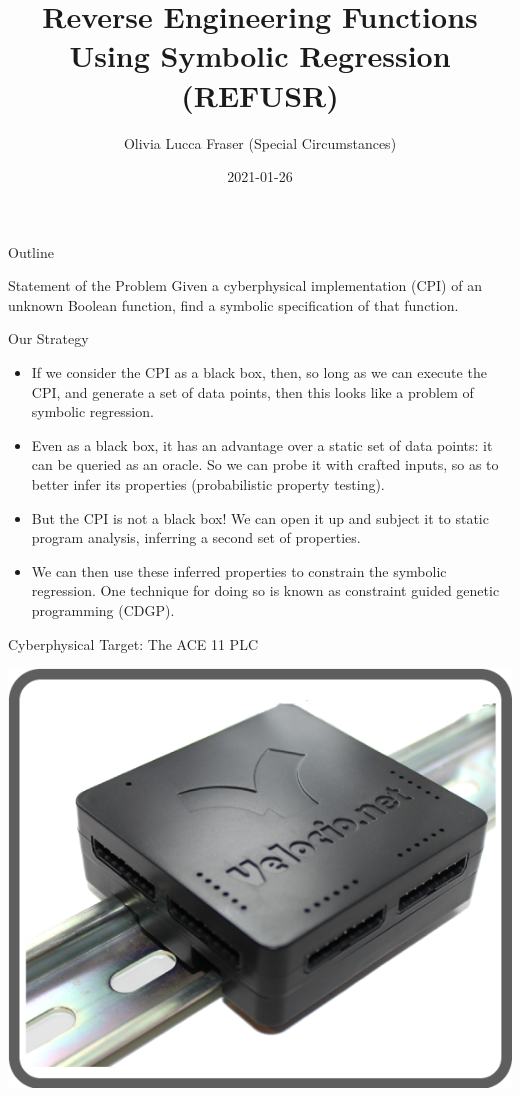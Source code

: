 \documentclass[presentation]{beamer}
\author{Olivia Lucca Fraser (Special Circumstances)}
\date{2021-01-26}
\title{Reverse Engineering Functions Using Symbolic Regression (REFUSR)}
\begin{document}
\maketitle
\begin{frame}{Outline}
\tableofcontents
\end{frame}



\begin{frame}[label={sec:org0195ba4}]{Statement of the Problem}
Given a cyberphysical implementation (CPI) of an unknown Boolean function, find a symbolic specification of that function.
\end{frame}

\begin{frame}[label={sec:orgb80416c}]{Our Strategy}
\begin{itemize}
\item If we consider the CPI as a \alert{black box}, then, so long as we can execute the CPI, and generate a set of data points, then this looks like a problem of \alert{symbolic regression}.
\item Even as a black box, it has an advantage over a static set of data points: it can be queried as an oracle. So we can \alert{probe} it with crafted inputs, so as to better infer its properties (probabilistic property testing).
\item But the CPI is \alert{not} a black box! We can open it up and subject it to static program analysis, inferring a second set of properties.
\item We can then \alert{use these inferred properties to constrain the symbolic regression}. One technique for doing so is known as \alert{constraint guided genetic programming} (CDGP).
\end{itemize}
\end{frame}



\begin{frame}[label={sec:orgf688650}]{Cyberphysical Target: The ACE 11 PLC}
\begin{center}
\includegraphics[width=.9\linewidth]{./img/Ace11.png}
\end{center}
\end{frame}
\end{document}
